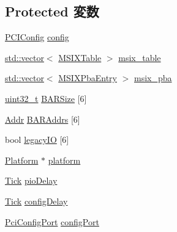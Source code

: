 \subsection*{Protected 変数}
\begin{DoxyCompactItemize}
\item 
\hyperlink{unionPCIConfig}{PCIConfig} \hyperlink{classPciDevice_ade310e2edd87f54d175985e8f2a07169}{config}
\item 
\hyperlink{classstd_1_1vector}{std::vector}$<$ \hyperlink{unionMSIXTable}{MSIXTable} $>$ \hyperlink{classPciDevice_ab0606d92415296978b3baa5dda5b5ae1}{msix\_\-table}
\item 
\hyperlink{classstd_1_1vector}{std::vector}$<$ \hyperlink{structMSIXPbaEntry}{MSIXPbaEntry} $>$ \hyperlink{classPciDevice_ad51ec643d8bcd3569f6f888cda1459fe}{msix\_\-pba}
\item 
\hyperlink{Type_8hh_a435d1572bf3f880d55459d9805097f62}{uint32\_\-t} \hyperlink{classPciDevice_ad96459f9cb0f58d55bfff45109038d7b}{BARSize} \mbox{[}6\mbox{]}
\item 
\hyperlink{base_2types_8hh_af1bb03d6a4ee096394a6749f0a169232}{Addr} \hyperlink{classPciDevice_af7b973e5ccbf88bd0019efd69c87e06c}{BARAddrs} \mbox{[}6\mbox{]}
\item 
bool \hyperlink{classPciDevice_ae450137518092f3968ce3fc4ee94d98d}{legacyIO} \mbox{[}6\mbox{]}
\item 
\hyperlink{classPlatform}{Platform} $\ast$ \hyperlink{classPciDevice_a75b48f1787959a4617f2a599d7c09aab}{platform}
\item 
\hyperlink{base_2types_8hh_a5c8ed81b7d238c9083e1037ba6d61643}{Tick} \hyperlink{classPciDevice_ac8e969635a78ab9ab123904ccca434cc}{pioDelay}
\item 
\hyperlink{base_2types_8hh_a5c8ed81b7d238c9083e1037ba6d61643}{Tick} \hyperlink{classPciDevice_a0448e6a6b68c3fa53f768cd05758f1f2}{configDelay}
\item 
\hyperlink{classPciDevice_1_1PciConfigPort}{PciConfigPort} \hyperlink{classPciDevice_a3c911166270cab77d55e5bc6626e8a05}{configPort}
\end{DoxyCompactItemize}
